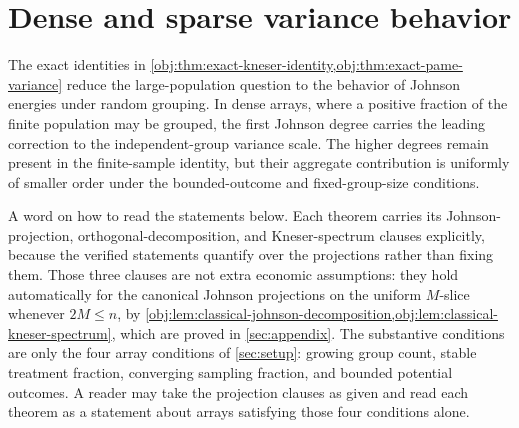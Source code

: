 \documentclass[11pt]{article}
\begin{document}
\section{Dense and sparse variance behavior}\label{sec:dense-sparse}

The exact identities in \cref{obj:thm:exact-kneser-identity,obj:thm:exact-pame-variance} reduce the large-population question to the behavior of Johnson energies under random grouping. In dense arrays, where a positive fraction of the finite population may be grouped, the first Johnson degree carries the leading correction to the independent-group variance scale. The higher degrees remain present in the finite-sample identity, but their aggregate contribution is uniformly of smaller order under the bounded-outcome and fixed-group-size conditions.

A word on how to read the statements below. Each theorem carries its Johnson-projection, orthogonal-decomposition, and Kneser-spectrum clauses explicitly, because the verified statements quantify over the projections rather than fixing them. Those three clauses are not extra economic assumptions: they hold automatically for the canonical Johnson projections on the uniform \(M\)-slice whenever \(2M\le n\), by \cref{obj:lem:classical-johnson-decomposition,obj:lem:classical-kneser-spectrum}, which are proved in \cref{sec:appendix}. The substantive conditions are only the four array conditions of \cref{sec:setup}: growing group count, stable treatment fraction, converging sampling fraction, and bounded potential outcomes. A reader may take the projection clauses as given and read each theorem as a statement about arrays satisfying those four conditions alone.
\end{document}

